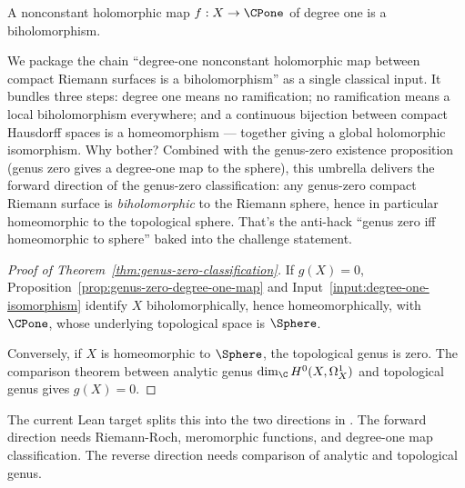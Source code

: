 \begin{theorem}
\label{input:degree-one-isomorphism}
\leanok
A nonconstant holomorphic map \(f:X\to\CPone\) of degree one is a
biholomorphism.
\end{theorem}

\begin{layman}
We package the chain ``degree-one nonconstant holomorphic map between
compact Riemann surfaces is a biholomorphism'' as a single classical
input. It bundles three steps: degree one means no ramification; no
ramification means a local biholomorphism everywhere; and a continuous
bijection between compact Hausdorff spaces is a homeomorphism — together
giving a global holomorphic isomorphism. Why bother? Combined with the
genus-zero existence proposition (genus zero gives a degree-one map to
the sphere), this umbrella delivers the forward direction of the
genus-zero classification: any genus-zero compact Riemann surface is
\emph{biholomorphic} to the Riemann sphere, hence in particular
homeomorphic to the topological sphere. That's the anti-hack
``genus zero iff homeomorphic to sphere'' baked into the challenge
statement.
\end{layman}

\begin{proof}[Proof of Theorem~\ref{thm:genus-zero-classification}]
If \(g(X)=0\), Proposition~\ref{prop:genus-zero-degree-one-map} and
Input~\ref{input:degree-one-isomorphism} identify \(X\) biholomorphically,
hence homeomorphically, with \(\CPone\), whose underlying topological space is
\(\Sphere\).

Conversely, if \(X\) is homeomorphic to \(\Sphere\), the topological genus is
zero. The comparison theorem between analytic genus
\(\dim_{\C}H^{0}(X,\Omega^{1}_{X})\) and topological genus gives \(g(X)=0\).
\end{proof}

\begin{formalizationnote}
The current Lean target splits this into the two directions in
. The forward
direction needs Riemann-Roch, meromorphic functions, and degree-one map
classification. The reverse direction needs comparison of analytic and
topological genus.
\end{formalizationnote}
